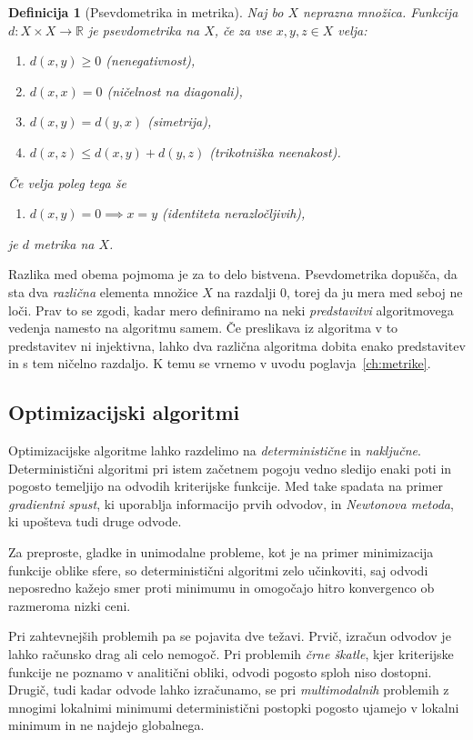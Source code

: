 \documentclass[a4paper, 12pt]{book}
\newtheorem{definicija}[izrek]{Definicija}
\begin{document}
\begin{definicija}[Psevdometrika in metrika]
\label{def:metrika}
Naj bo $X$ neprazna množica. Funkcija $d \colon X \times X \to \mathbb{R}$ je
\emph{psevdometrika} na $X$, če za vse $x, y, z \in X$ velja:
\begin{enumerate}
    \item[(i)] $d(x,y) \ge 0$ \quad (nenegativnost),
    \item[(ii)] $d(x,x) = 0$ \quad (ničelnost na diagonali),
    \item[(iii)] $d(x,y) = d(y,x)$ \quad (simetrija),
    \item[(iv)] $d(x,z) \le d(x,y) + d(y,z)$ \quad (trikotniška neenakost).
\end{enumerate}
Če velja poleg tega še
\begin{enumerate}
    \item[(v)] $d(x,y) = 0 \implies x = y$ \quad (identiteta nerazločljivih),
\end{enumerate}
je $d$ \emph{metrika} na $X$.
\end{definicija}

Razlika med obema pojmoma je za to delo bistvena. Psevdometrika dopušča, da
sta dva \emph{različna} elementa množice $X$ na razdalji 0, torej da ju
mera med seboj ne loči. Prav to se zgodi, kadar mero definiramo na neki
\emph{predstavitvi} algoritmovega vedenja namesto na algoritmu samem. Če
preslikava iz algoritma v to predstavitev ni injektivna, lahko dva različna
algoritma dobita enako predstavitev in s tem ničelno razdaljo. K temu se
vrnemo v uvodu poglavja~\ref{ch:metrike}.

\subsection{Optimizacijski algoritmi}
\label{sec:opt_meta}
Optimizacijske algoritme lahko razdelimo na \emph{deterministične} in
\emph{naključne}. Deterministični algoritmi pri istem začetnem pogoju vedno
sledijo enaki poti in pogosto temeljijo na odvodih kriterijske funkcije.
Med take spadata na primer \emph{gradientni spust}, ki uporablja informacijo
prvih odvodov, in \emph{Newtonova metoda}, ki upošteva tudi druge odvode.
 
Za preproste, gladke in unimodalne probleme, kot je na primer minimizacija
funkcije oblike sfere, so deterministični algoritmi zelo učinkoviti, saj
odvodi neposredno kažejo smer proti minimumu in omogočajo hitro konvergenco
ob razmeroma nizki ceni.
 
Pri zahtevnejših problemih pa se pojavita dve težavi. Prvič, izračun odvodov
je lahko računsko drag ali celo nemogoč. Pri problemih \emph{črne škatle},
kjer kriterijske funkcije ne poznamo v analitični obliki, odvodi pogosto
sploh niso dostopni. Drugič, tudi kadar odvode lahko izračunamo, se pri
\emph{multimodalnih} problemih z mnogimi lokalnimi minimumi deterministični
postopki pogosto ujamejo v lokalni minimum in ne najdejo globalnega. 
\end{document}
